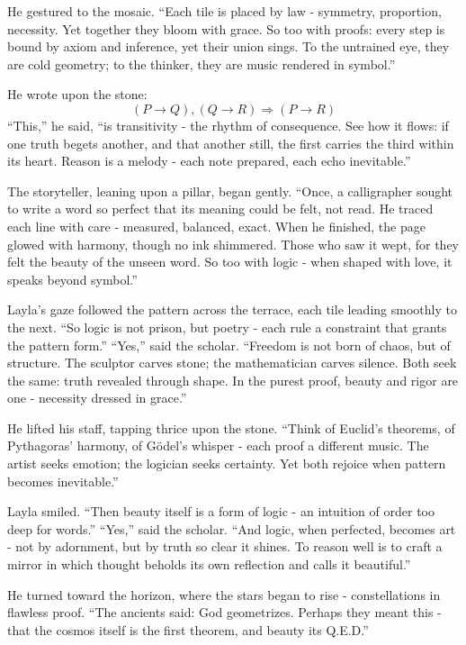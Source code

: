 \documentclass[
  letterpaper,
  DIV=11,
  numbers=noendperiod]{scrreprt}
\begin{document}
He gestured to the mosaic. ``Each tile is placed by law - symmetry,
proportion, necessity. Yet together they bloom with grace. So too with
proofs: every step is bound by axiom and inference, yet their union
sings. To the untrained eye, they are cold geometry; to the thinker,
they are music rendered in symbol.''

He wrote upon the stone: \[
(P \rightarrow Q), (Q \rightarrow R) \Rightarrow (P \rightarrow R)
\] ``This,'' he said, ``is transitivity - the rhythm of consequence. See
how it flows: if one truth begets another, and that another still, the
first carries the third within its heart. Reason is a melody - each note
prepared, each echo inevitable.''

The storyteller, leaning upon a pillar, began gently. ``Once, a
calligrapher sought to write a word so perfect that its meaning could be
felt, not read. He traced each line with care - measured, balanced,
exact. When he finished, the page glowed with harmony, though no ink
shimmered. Those who saw it wept, for they felt the beauty of the unseen
word. So too with logic - when shaped with love, it speaks beyond
symbol.''

Layla's gaze followed the pattern across the terrace, each tile leading
smoothly to the next. ``So logic is not prison, but poetry - each rule a
constraint that grants the pattern form.'' ``Yes,'' said the scholar.
``Freedom is not born of chaos, but of structure. The sculptor carves
stone; the mathematician carves silence. Both seek the same: truth
revealed through shape. In the purest proof, beauty and rigor are one -
necessity dressed in grace.''

He lifted his staff, tapping thrice upon the stone. ``Think of Euclid's
theorems, of Pythagoras' harmony, of Gödel's whisper - each proof a
different music. The artist seeks emotion; the logician seeks certainty.
Yet both rejoice when pattern becomes inevitable.''

Layla smiled. ``Then beauty itself is a form of logic - an intuition of
order too deep for words.'' ``Yes,'' said the scholar. ``And logic, when
perfected, becomes art - not by adornment, but by truth so clear it
shines. To reason well is to craft a mirror in which thought beholds its
own reflection and calls it beautiful.''

He turned toward the horizon, where the stars began to rise -
constellations in flawless proof. ``The ancients said: God geometrizes.
Perhaps they meant this - that the cosmos itself is the first theorem,
and beauty its Q.E.D.''
\end{document}
